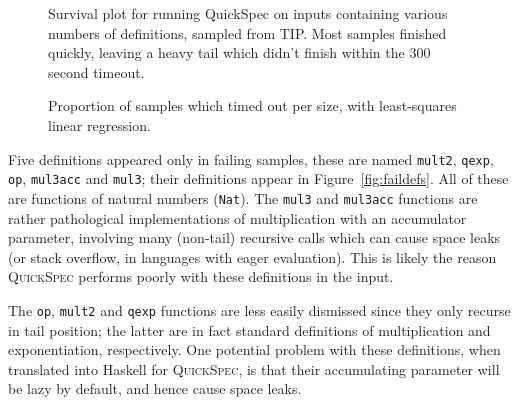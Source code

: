\begin{figure}
  
  \caption{Survival plot %
    for running QuickSpec on inputs containing various numbers of definitions,
    sampled from TIP. Most samples finished quickly, leaving a heavy tail which
    didn't finish within the 300 second timeout.}
  \label{fig:survival}
\end{figure}

\begin{figure}
  
  \caption{Proportion of samples which timed out per size, with least-squares
    linear regression.}
  \label{fig:tailsize}
\end{figure}

\begin{figure}
  
  \caption{}
  \label{fig:proportions}
\end{figure}

Five definitions appeared only in failing samples, these are named
\texttt{mult2}, \texttt{qexp}, \texttt{op}, \texttt{mul3acc} and \texttt{mul3};
their definitions appear in Figure~\ref{fig:faildefs}. All of these are
functions of natural numbers (\texttt{Nat}). The \texttt{mul3} and
\texttt{mul3acc} functions are rather pathological implementations of
multiplication with an accumulator parameter, involving many (non-tail)
recursive calls which can cause space leaks (or stack overflow, in languages
with eager evaluation). This is likely the reason \textsc{QuickSpec} performs
poorly with these definitions in the input.

The \texttt{op}, \texttt{mult2} and \texttt{qexp} functions are less easily
dismissed since they only recurse in tail position; the latter are in fact
standard definitions of multiplication and exponentiation, respectively. One
potential problem with these definitions, when translated into Haskell for
\textsc{QuickSpec}, is that their accumulating parameter will be lazy by
default, and hence cause space leaks.

